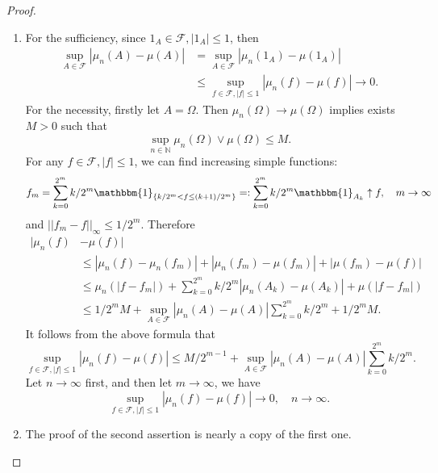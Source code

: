 \documentclass[12pt]{article}
\renewcommand{\(}{\left(}%
\renewcommand{\)}{\right)}%
\renewcommand{\[}{\left[}%
\renewcommand{\]}{\right]}%
\newcommand{\n}{\mathbb{N}}
\newcommand{\f}{\mathscr{F}}
\newtheorem{proof}{Proof.}}
\begin{document}
  \begin{proof}
  	\begin{enumerate}
  		\item For the sufficiency, since $1_A\in\f,|1_A|\leq 1$, then
  		\begin{equation*}
  			\begin{split}
  				\sup_{A\in\f }|\mu_n(A)-\mu(A)|&=\sup_{A\in\f }|\mu_n(1_A)-\mu(1_A)|\\
  				&\leq \sup_{f\in\f,|f|\leq 1}|\mu_n(f)-\mu(f)|\to 0.
  			\end{split}
  		\end{equation*}
  		For the necessity, firstly let $A=\Omega$. Then $\mu_n(\Omega)\to\mu(\Omega)$ implies exists $M>0$ such that 
  		\begin{equation*}
  			\sup_{n\in\n}\mu_n(\Omega)\vee \mu(\Omega)\leq M.
  		\end{equation*}
  		For any $f\in \f,|f|\leq 1$, we can find increasing simple functions:
  		\begin{equation*}
  			f_m=\sum_{k=0}^{2^m}k/2^m\mathbbm{1}_{\{k/2^m<f\leq (k+1)/2^m  \}}=:\sum_{k=0}^{2^m}k/2^m\mathbbm{1}_{A_k}\uparrow f,\quad m\to\infty
  		\end{equation*}
  		and $||f_m-f||_\infty\leq 1/2^m$. Therefore 
  		\begin{equation*}
  			\begin{split}
  				|\mu_n(f)&-\mu(f)|\\
  				&\leq |\mu_n(f)-\mu_n(f_m)|+|\mu_n(f_m)-\mu(f_m)|+|\mu(f_m)-\mu(f)|\\
  				&\leq \mu_n(|f-f_m|)+\sum_{k=0}^{2^m}k/2^m|\mu_n(A_k)-\mu(A_k)|+\mu(|f-f_m|)\\
  				&\leq 1/2^m M+\sup_{A\in\f} |\mu_n(A)-\mu(A)|\sum_{k=0}^{2^m}k/2^m+1/2^m M.
  			\end{split}
  		\end{equation*}
  		It follows from the above formula that
  		\begin{equation*}
  			\sup_{f\in\f,|f|\leq 1}|\mu_n(f)-\mu(f)|\leq M/2^{m-1}+\sup_{A\in\f}|\mu_n(A)-\mu(A)|\sum_{k=0}^{2^m}k/2^m.
  		\end{equation*}
  		Let $n\to\infty$ first, and then let $m\to\infty$, we have 
  		\begin{equation*}
  			\sup_{f\in\f,|f|\leq 1}|\mu_n(f)-\mu(f)|\to 0,\quad n\to\infty.
  		\end{equation*}
  		\item The proof of the second assertion is nearly a copy of the first one.
  	\end{enumerate}
  \end{proof}
  
\end{document}
